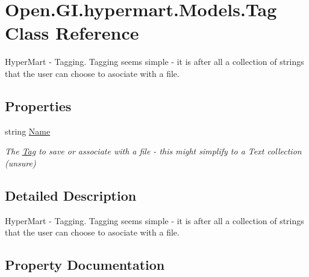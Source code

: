 \hypertarget{class_open_1_1_g_i_1_1hypermart_1_1_models_1_1_tag}{}\section{Open.\+G\+I.\+hypermart.\+Models.\+Tag Class Reference}
\label{class_open_1_1_g_i_1_1hypermart_1_1_models_1_1_tag}


Hyper\+Mart -\/ Tagging. Tagging seems simple -\/ it is after all a collection of strings that the user can choose to asociate with a file.  


\subsection*{Properties}
\begin{DoxyCompactItemize}
\item 
string \hyperlink{class_open_1_1_g_i_1_1hypermart_1_1_models_1_1_tag_a9aa9f9231f2e67fc98403f5ae6be4c0c}{Name}
\begin{DoxyCompactList}\small\item\em The \hyperlink{class_open_1_1_g_i_1_1hypermart_1_1_models_1_1_tag}{Tag} to save or associate with a file -\/ this might simplify to a Text collection (unsure) \end{DoxyCompactList}\end{DoxyCompactItemize}


\subsection{Detailed Description}
Hyper\+Mart -\/ Tagging. Tagging seems simple -\/ it is after all a collection of strings that the user can choose to asociate with a file. 



\subsection{Property Documentation}
\hypertarget{class_open_1_1_g_i_1_1hypermart_1_1_models_1_1_tag_a9aa9f9231f2e67fc98403f5ae6be4c0c}{}\label{class_open_1_1_g_i_1_1hypermart_1_1_models_1_1_tag_a9aa9f9231f2e67fc98403f5ae6be4c0c} 
